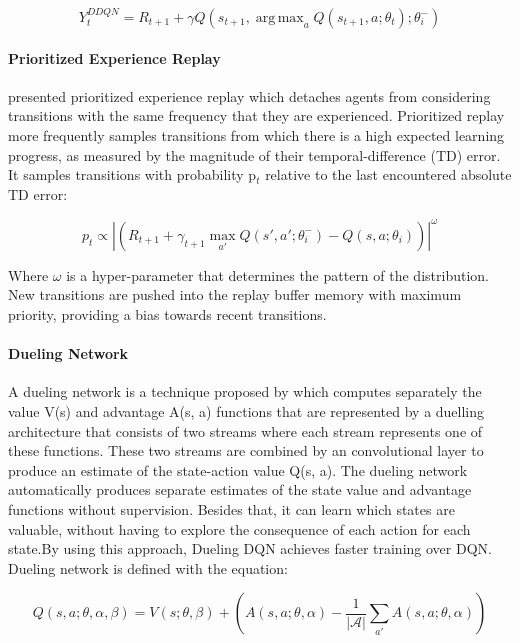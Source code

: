 \documentclass{llncs}
\DeclareMathOperator*{\argmax}{arg\,max}
\begin{document}
\begin{equation}
Y_{t}^{DDQN} = R_{t+1} + \gamma Q(s_{t+1}, \argmax_{a} Q(s_{t+1}, a;\theta_{t});\theta_{i}^{-})
\end{equation}

\paragraph{\textbf{Prioritized Experience Replay}}

\cite{SchaulQAS15} presented prioritized experience replay which detaches agents from considering transitions with the same frequency that they are experienced. Prioritized replay more frequently samples transitions from which there is a high expected learning progress, as measured by the magnitude of their temporal-difference (TD) error. It samples transitions with probability p$_{t}$ relative to the last encountered absolute TD error:
	
\begin{equation}
p_{t} \propto \left|\left(R_{t+1} + \gamma_{t+1} \max_{a'}Q\left(s',a';\theta_{i}^{-}\right) - Q\left(s,a;\theta_{i}\right)\right)\right|^{\omega}
\end{equation}

Where $\omega$ is a hyper-parameter that determines the pattern of the distribution. New transitions are pushed into the replay buffer memory with maximum priority, providing a bias towards recent transitions.

\paragraph{\textbf{Dueling Network}}\label{duelingNet}

A dueling network is a technique proposed by \cite{Wang2016} which computes separately the value V(s) and advantage A(s, a) functions that are represented by a duelling architecture that consists of two streams where each stream represents one of these functions. These two streams are combined by an convolutional layer to produce an estimate of the state-action value Q(s, a). The dueling network automatically produces separate estimates of the state value and advantage functions without supervision. Besides that, it can learn which states are valuable, without having to explore the consequence of each action for each state.By using this approach, Dueling DQN achieves faster training over DQN. Dueling network is defined with the equation:

\begin{equation} \label{eq:dueling eq}
Q(s,a;\theta,\alpha,\beta) = V(s;\theta,\beta) + \left( A\left(s,a;\theta,\alpha \right) - \frac{1}{|\mathcal{A}|} \displaystyle\sum_{a'} A\left(s,a;\theta,\alpha \right) \right) 
\end{equation}
\end{document}
